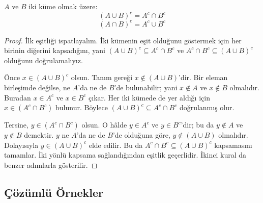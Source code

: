 \begin{theorem}
$A$ ve $B$ iki küme olmak üzere:
\[ (A \cup B)^c = A^c \cap B^c \]
\[ (A \cap B)^c = A^c \cup B^c \]
\end{theorem}
\begin{proof}
İlk eşitliği ispatlayalım. İki kümenin eşit olduğunu göstermek için her birinin diğerini kapsadığını, yani $(A \cup B)^c \subseteq A^c \cap B^c$ ve $A^c \cap B^c \subseteq (A \cup B)^c$ olduğunu doğrulamalıyız.

Önce $x \in (A \cup B)^c$ olsun. Tanım gereği $x \notin (A \cup B)$'dir. Bir eleman birleşimde değilse, ne $A$'da ne de $B$'de bulunabilir; yani $x \notin A$ ve $x \notin B$ olmalıdır. Buradan $x \in A^c$ ve $x \in B^c$ çıkar. Her iki kümede de yer aldığı için $x \in (A^c \cap B^c)$ bulunur. Böylece $(A \cup B)^c \subseteq A^c \cap B^c$ doğrulanmış olur.

Tersine, $y \in (A^c \cap B^c)$ olsun. O hâlde $y \in A^c$ ve $y \in B^c$'dir; bu da $y \notin A$ ve $y \notin B$ demektir. $y$ ne $A$'da ne de $B$'de olduğuna göre, $y \notin (A \cup B)$ olmalıdır. Dolayısıyla $y \in (A \cup B)^c$ elde edilir. Bu da $A^c \cap B^c \subseteq (A \cup B)^c$ kapsamasını tamamlar. İki yönlü kapsama sağlandığından eşitlik geçerlidir. İkinci kural da benzer adımlarla gösterilir.
\end{proof}

\subsection{Çözümlü Örnekler}

